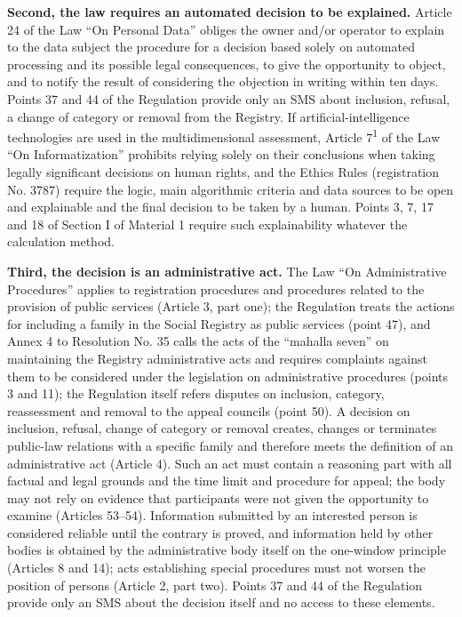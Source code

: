 \documentclass[14pt,a4paper]{extarticle}
\begin{document}
\textbf{Second, the law requires an automated decision to be explained.} Article 24 of the Law “On Personal Data” obliges the owner and/or operator to explain to the data subject the procedure for a decision based solely on automated processing and its possible legal consequences, to give the opportunity to object, and to notify the result of considering the objection in writing within ten days\cite{pdlaw}. Points 37 and 44 of the Regulation provide only an SMS about inclusion, refusal, a change of category or removal from the Registry\cite{res35}. If artificial-intelligence technologies are used in the multidimensional assessment, Article 7\textsuperscript{1} of the Law “On Informatization” prohibits relying solely on their conclusions when taking legally significant decisions on human rights, and the Ethics Rules (registration No. 3787) require the logic, main algorithmic criteria and data sources to be open and explainable and the final decision to be taken by a human\cite{inform,ethics}. Points 3, 7, 17 and 18 of Section I of Material 1 require such explainability whatever the calculation method.

\textbf{Third, the decision is an administrative act.} The Law “On Administrative Procedures” applies to registration procedures and procedures related to the provision of public services (Article 3, part one); the Regulation treats the actions for including a family in the Social Registry as public services (point 47), and Annex 4 to Resolution No. 35 calls the acts of the “mahalla seven” on maintaining the Registry administrative acts and requires complaints against them to be considered under the legislation on administrative procedures (points 3 and 11); the Regulation itself refers disputes on inclusion, category, reassessment and removal to the appeal councils (point 50)\cite{res35}. A decision on inclusion, refusal, change of category or removal creates, changes or terminates public-law relations with a specific family and therefore meets the definition of an administrative act (Article 4). Such an act must contain a reasoning part with all factual and legal grounds and the time limit and procedure for appeal; the body may not rely on evidence that participants were not given the opportunity to examine (Articles 53–54). Information submitted by an interested person is considered reliable until the contrary is proved, and information held by other bodies is obtained by the administrative body itself on the one-window principle (Articles 8 and 14); acts establishing special procedures must not worsen the position of persons (Article 2, part two)\cite{apl}. Points 37 and 44 of the Regulation provide only an SMS about the decision itself and no access to these elements.
\end{document}
